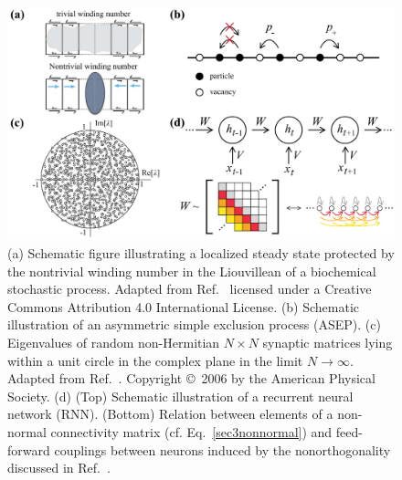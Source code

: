 \documentclass{tADP2e}
\theoremstyle{plain}
\theoremstyle{plain}
\theoremstyle{definition}
\begin{document}
\begin{figure}
\begin{center}
\includegraphics[width=13cm]{./Figures/fig_3_bio.pdf}
\end{center}
\caption{ (a) Schematic figure illustrating a localized steady state protected by the nontrivial winding number in the Liouvillean of a biochemical stochastic process. 
Adapted from Ref.~\cite{MA17} licensed under a Creative Commons Attribution 4.0 International License. (b) Schematic illustration of an asymmetric simple exclusion process (ASEP). (c) Eigenvalues of random non-Hermitian $N\times N$ synaptic matrices lying within a unit circle in the complex plane in the limit $N\to\infty$. Adapted from Ref.~\cite{RK06}. Copyright \copyright\,   2006 by the American Physical Society. (d) (Top) Schematic illustration of a recurrent neural network (RNN). (Bottom) Relation between elements of a non-normal connectivity matrix (cf. Eq.~\eqref{sec3nonnormal}) and feed-forward couplings between neurons induced by the nonorthogonality discussed in Ref.~\cite{KG19}. }
\label{fig:3bio}
\end{figure}
 
\end{document}
